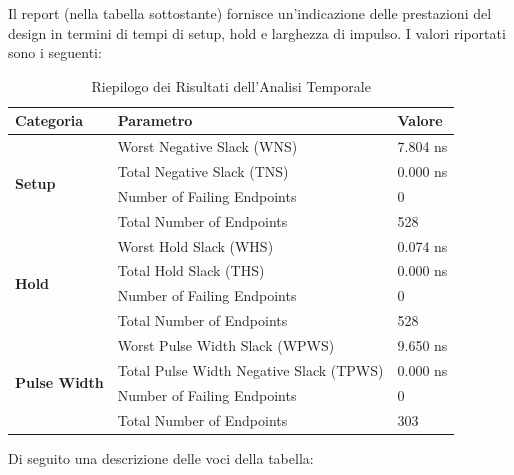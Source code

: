 \documentclass{article}
\begin{document}
Il report (nella tabella sottostante) fornisce un'indicazione delle prestazioni del design in termini di tempi di setup, hold e larghezza di impulso. I valori riportati sono i seguenti:
\begin{table}[H]
    \centering
    \caption{Riepilogo dei Risultati dell'Analisi Temporale}
    \label{tab:timing_analysis_summary}
    \begin{tabular}{|l|l|l|}
        \hline
        \textbf{Categoria} & \textbf{Parametro} & \textbf{Valore} \\
        \hline
        \multirow{4}{*}{\textbf{Setup}} & Worst Negative Slack (WNS) & 7.804 ns \\
        & Total Negative Slack (TNS) & 0.000 ns \\
        & Number of Failing Endpoints & 0 \\
        & Total Number of Endpoints & 528 \\
        \hline
        \multirow{4}{*}{\textbf{Hold}} & Worst Hold Slack (WHS) & 0.074 ns \\
        & Total Hold Slack (THS) & 0.000 ns \\
        & Number of Failing Endpoints & 0 \\
        & Total Number of Endpoints & 528 \\
        \hline
        \multirow{4}{*}{\textbf{Pulse Width}} & Worst Pulse Width Slack (WPWS) & 9.650 ns \\
        & Total Pulse Width Negative Slack (TPWS) & 0.000 ns \\
        & Number of Failing Endpoints & 0 \\
        & Total Number of Endpoints & 303 \\
        \hline
    \end{tabular}
\end{table}
\noindent Di seguito una descrizione delle voci della tabella:
\end{document}
